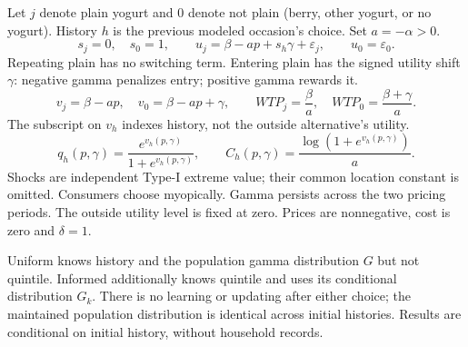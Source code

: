 \newpage
{}
Let $j$ denote plain yogurt and $0$ denote not plain (berry, other yogurt, or no yogurt).
History $h$ is the previous modeled occasion's choice. Set $a=-\alpha>0$.
\[
s_j=0,\quad s_0=1,\qquad
u_j=\beta-ap+s_h\gamma+\varepsilon_j,\qquad u_0=\varepsilon_0.
\]
Repeating plain has no switching term. Entering plain has the signed utility shift $\gamma$:
negative gamma penalizes entry; positive gamma rewards it.
\[
v_j=\beta-ap,\quad v_0=\beta-ap+\gamma,\qquad
WTP_j=\frac{\beta}{a},\quad WTP_0=\frac{\beta+\gamma}{a}.
\]
The subscript on $v_h$ indexes history, not the outside alternative's utility.
\[
q_h(p,\gamma)=\frac{e^{v_h(p,\gamma)}}{1+e^{v_h(p,\gamma)}},\qquad
C_h(p,\gamma)=\frac{\log(1+e^{v_h(p,\gamma)})}{a}.
\]
Shocks are independent Type-I extreme value; their common location constant is omitted.
Consumers choose myopically. Gamma persists across the two pricing periods.
The outside utility level is fixed at zero. Prices are nonnegative, cost is zero and $\delta=1$.

Uniform knows history and the population gamma distribution $G$ but not quintile.
Informed additionally knows quintile and uses its conditional distribution $G_k$.
There is no learning or updating after either choice; the maintained population distribution
is identical across initial histories. Results are conditional on initial history, without household records.

